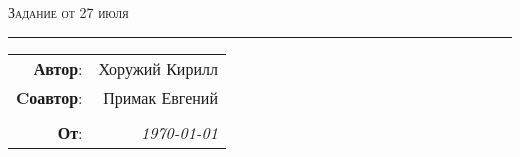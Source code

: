 
\begin{center}
    \Large \textsc{Задание от 27 июля
    }
\end{center}

\hrule

\phantom{42}

\begin{flushright}
    \begin{tabular}{rr}
        \textbf{Автор}: 
        & Хоружий Кирилл \\
        \textbf{Cоавтор}: 
        & Примак Евгений \\
        & \\
        \textbf{От}: &
        \textit{\today}\\
    \end{tabular}
\end{flushright}

\thispagestyle{empty}

